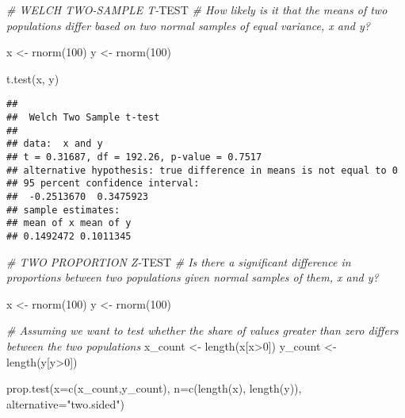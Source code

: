 \documentclass[
]{article}
\newenvironment{Shaded}{\begin{snugshade}}{\end{snugshade}}
\newcommand{\AlertTok}[1]{\textcolor[rgb]{0.94,0.16,0.16}{#1}}
\newcommand{\AttributeTok}[1]{\textcolor[rgb]{0.77,0.63,0.00}{#1}}
\newcommand{\CommentTok}[1]{\textcolor[rgb]{0.56,0.35,0.01}{\textit{#1}}}
\newcommand{\DecValTok}[1]{\textcolor[rgb]{0.00,0.00,0.81}{#1}}
\newcommand{\FunctionTok}[1]{\textcolor[rgb]{0.00,0.00,0.00}{#1}}
\newcommand{\NormalTok}[1]{#1}
\newcommand{\OtherTok}[1]{\textcolor[rgb]{0.56,0.35,0.01}{#1}}
\newcommand{\SpecialCharTok}[1]{\textcolor[rgb]{0.00,0.00,0.00}{#1}}
\newcommand{\StringTok}[1]{\textcolor[rgb]{0.31,0.60,0.02}{#1}}
\begin{document}
\begin{Shaded}
\begin{Highlighting}[]
\CommentTok{\# WELCH TWO{-}SAMPLE T{-}}\AlertTok{TEST}
\CommentTok{\# How likely is it that the means of two populations differ based on two normal samples of equal variance, x and y?}

\NormalTok{x }\OtherTok{\textless{}{-}} \FunctionTok{rnorm}\NormalTok{(}\DecValTok{100}\NormalTok{)}
\NormalTok{y }\OtherTok{\textless{}{-}} \FunctionTok{rnorm}\NormalTok{(}\DecValTok{100}\NormalTok{)}

\FunctionTok{t.test}\NormalTok{(x, y)}
\end{Highlighting}
\end{Shaded}

\begin{verbatim}
## 
##  Welch Two Sample t-test
## 
## data:  x and y
## t = 0.31687, df = 192.26, p-value = 0.7517
## alternative hypothesis: true difference in means is not equal to 0
## 95 percent confidence interval:
##  -0.2513670  0.3475923
## sample estimates:
## mean of x mean of y 
## 0.1492472 0.1011345
\end{verbatim}

\begin{Shaded}
\begin{Highlighting}[]
\CommentTok{\# TWO PROPORTION Z{-}}\AlertTok{TEST}
\CommentTok{\# Is there a significant difference in proportions between two populations given normal samples of them, x and y?}

\NormalTok{x }\OtherTok{\textless{}{-}} \FunctionTok{rnorm}\NormalTok{(}\DecValTok{100}\NormalTok{)}
\NormalTok{y }\OtherTok{\textless{}{-}} \FunctionTok{rnorm}\NormalTok{(}\DecValTok{100}\NormalTok{)}

\CommentTok{\# Assuming we want to test whether the share of values greater than zero differs between the two populations}
\NormalTok{x\_count }\OtherTok{\textless{}{-}} \FunctionTok{length}\NormalTok{(x[x}\SpecialCharTok{\textgreater{}}\DecValTok{0}\NormalTok{])}
\NormalTok{y\_count }\OtherTok{\textless{}{-}} \FunctionTok{length}\NormalTok{(y[y}\SpecialCharTok{\textgreater{}}\DecValTok{0}\NormalTok{])}

\FunctionTok{prop.test}\NormalTok{(}\AttributeTok{x=}\FunctionTok{c}\NormalTok{(x\_count,y\_count), }\AttributeTok{n=}\FunctionTok{c}\NormalTok{(}\FunctionTok{length}\NormalTok{(x), }\FunctionTok{length}\NormalTok{(y)), }\AttributeTok{alternative=}\StringTok{"two.sided"}\NormalTok{)}
\end{Highlighting}
\end{Shaded}
\end{document}
